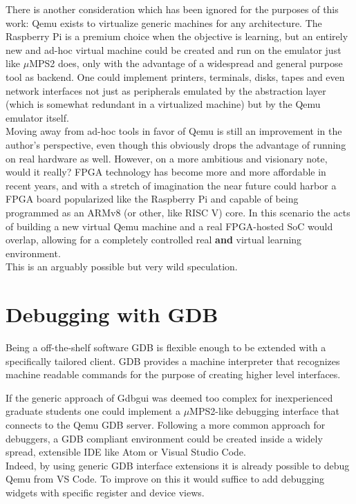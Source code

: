 \documentclass[12pt,a4paper,openright,twoside]{report}
\begin{document}
There is another consideration which has been ignored for the purposes of this
work: Qemu exists to virtualize generic machines for any architecture. The 
Raspberry Pi is a premium choice when the objective is learning, 
but an entirely new and ad-hoc virtual machine could be created and run on the
emulator just like $\mu$MPS2 does, only with the advantage of a widespread and
general purpose tool as backend. One could implement printers, terminals, disks,
tapes and even network interfaces not just as peripherals emulated by the abstraction
layer (which is somewhat redundant in a virtualized machine) but by the Qemu
emulator itself. \\
Moving away from ad-hoc tools in favor of Qemu is still an improvement
in the author's perspective, even though this obviously drops the advantage 
of running on real hardware as well.
However, on a more ambitious and visionary note, would it really? FPGA technology
has become more and more affordable in recent years, and with a stretch of imagination
the near future could harbor a FPGA board popularized like the Raspberry Pi and
capable of being programmed as an ARMv8 (or other, like RISC V) core. In this scenario the acts of 
building a new virtual Qemu machine and a real FPGA-hosted SoC would overlap,
allowing for a completely controlled real \textbf{and} virtual learning environment.\\
This is an arguably possible but very wild speculation.


\section{Debugging with GDB}
Being a off-the-shelf software GDB is flexible enough to be extended with 
a specifically tailored client. GDB provides a machine interpreter that recognizes
machine readable commands for the purpose of creating higher level interfaces.

If the generic approach of Gdbgui was deemed too complex for inexperienced graduate
students one could implement a $\mu$MPS2-like debugging interface that connects
to the Qemu GDB server. 
Following a more common approach for debuggers, a GDB compliant
 environment could be created inside a widely spread, extensible IDE like Atom or 
Visual Studio Code.\\
Indeed, by using generic GDB interface extensions it is already possible to debug
Qemu from VS Code. To improve on this it would suffice to add debugging widgets
with specific register and device views.
\end{document}
